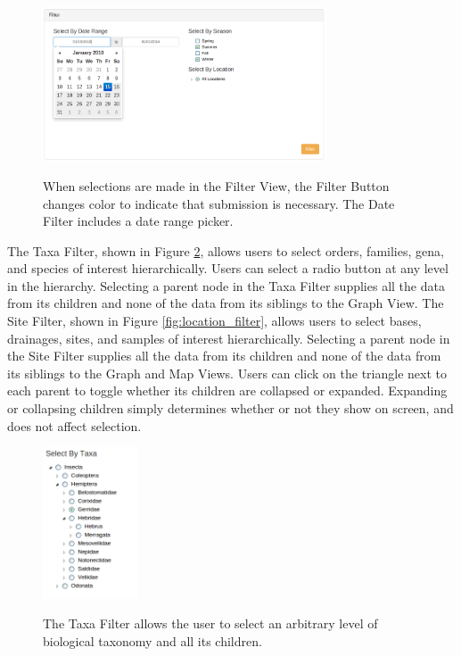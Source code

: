 \documentclass[10pt,peerreview,onecolumn,draftclsnofoot,technote]{IEEEtran}
\begin{document}
\begin{figure}[h]
\centering
\includegraphics[width=0.75\textwidth]{images/date_filter.png}
\label{fig:date_filter}
\captionsetup{justification=centering}
\caption{
  When selections are made in the Filter View, the Filter Button changes color to indicate that submission is necessary.
  The Date Filter includes a date range picker.
}
\end{figure}

The Taxa Filter, shown in Figure \ref{fig:taxa_filter}, allows users to select orders, families, gena, and species of interest hierarchically.
Users can select a radio button at any level in the hierarchy.
Selecting a parent node in the Taxa Filter supplies all the data from its children and none of the data from its siblings to the Graph View.
The Site Filter, shown in Figure \ref{fig:location_filter}, allows users to select bases, drainages, sites, and samples of interest hierarchically.
Selecting a parent node in the Site Filter supplies all the data from its children and none of the data from its siblings to the Graph and Map Views.
Users can click on the triangle next to each parent to toggle whether its children are collapsed or expanded.
Expanding or collapsing children simply determines whether or not they show on screen, and does not affect selection.

\begin{figure}[h]
\centering
\includegraphics[width=0.25\textwidth]{images/taxa_filter.png}
\label{fig:taxa_filter}
\captionsetup{justification=centering}
\caption{
  The Taxa Filter allows the user to select an arbitrary level of biological taxonomy and all its children.
}
\end{figure}
\end{document}
